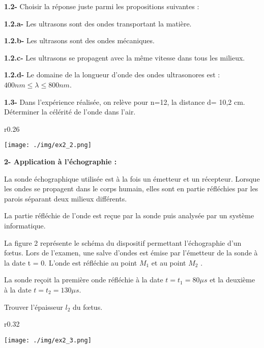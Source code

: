 \documentclass[12pt, french]{article}
\begin{document}
\textbf{1.2- } Choisir la réponse juste parmi les propositions suivantes :

\textbf{1.2.a- } Les ultrasons sont des ondes transportant la matière.

\textbf{1.2.b- }Les ultrasons sont des ondes mécaniques.

\textbf{1.2.c- }Les ultrasons se propagent avec la même vitesse dans tous les milieux.

\textbf{1.2.d- }Le domaine de la longueur d'onde des ondes ultrasonores est : $400 nm  \leq \lambda \leq 800 nm$.

\textbf{1.3- }Dans l'expérience réalisée, on relève pour n=12, la distance d= 10,2 cm. Déterminer la célérité de l’onde dans l'air.

\begin{wrapfigure}[8]{r}{0.26\textwidth}
  \begin{center}
	  \vspace{-1cm}
	\texttt{[image: ./img/ex2\_2.png]}
  \end{center}
\end{wrapfigure}


\textbf{2- Application à l'échographie :\dotfill}

La sonde échographique utilisée est à la fois un émetteur et un
récepteur. Lorsque les ondes se propagent dans le corps humain, elles
sont en partie réfléchies par les parois séparant deux milieux différents.

La partie réfléchie de l'onde est reçue par la sonde puis analysée par
un système informatique.

La figure 2 représente le schéma du dispositif permettant
l'échographie d'un fœtus. Lors de l'examen, une salve d'ondes est émise
par l'émetteur de la sonde à la date t = 0. L'onde est réfléchie au point
$M_1$ et au point $M_2$ .

La sonde reçoit la première onde réfléchie à la date $t = t_1 = 80\mu{s}$ et la deuxième à la date $t =t_2 = 130\mu{s}$.

Trouver l'épaisseur $l_2$ du fœtus.

\begin{wrapfigure}[8]{r}{0.32\textwidth}
  \begin{center}
	  \vspace{-1.5cm}
	\texttt{[image: ./img/ex2\_3.png]}
  \end{center}
\end{wrapfigure}
\end{document}
